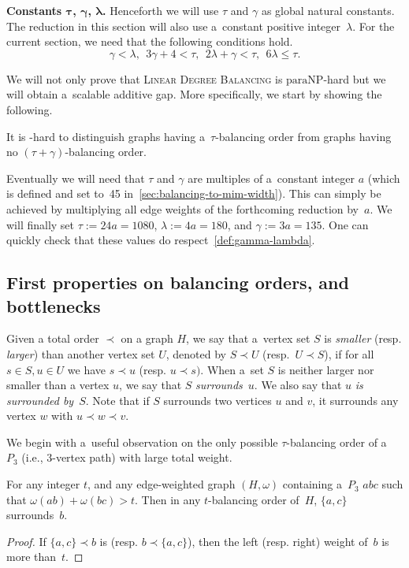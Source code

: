 \documentclass[a4paper,UKenglish,cleveref,hyperref,autoref]{lipics-v2021}
\newcommand{\paraNP}{\ensuremath{\mathrm{paraNP}}}
\newcommand{\weight}{\omega}
\newcommand{\ldb}{\textsc{Linear Degree Balancing}\xspace}
\begin{document}
\medskip

\textbf{Constants $\bm{\tau}$, $\bm{\gamma}$, $\bm{\lambda}$.}
Henceforth we will use $\tau$ and $\gamma$ as global natural constants.
The reduction in this section will also use a~constant positive integer~$\lambda$.
For the current section, we need that the following conditions hold.
\begin{equation}\label{def:gamma-lambda}
 \gamma < \lambda,~~3\gamma + 4 < \tau,~~2\lambda + \gamma < \tau,~~6 \lambda \leqslant \tau.
\end{equation}

We will not only prove that \ldb is \paraNP-hard but we will obtain a~scalable additive gap. 
More specifically, we start by showing the following.

\begin{theorem}\label{thm:ldb}
  It is \NP-hard to distinguish graphs having \mbox{a~$\tau$-balancing} order from graphs having no $(\tau + \gamma)$-balancing order.
\end{theorem}

Eventually we will need that $\tau$ and $\gamma$ are multiples of a~constant integer $a$ (which is defined and set to~45 in~\cref{sec:balancing-to-mim-width}).
This can simply be achieved by multiplying all edge weights of the forthcoming reduction by~$a$.
We will finally set $\tau := 24a = 1080$, $\lambda := 4a = 180$, and $\gamma := 3a = 135$.
One can quickly check that these values do respect~\cref{def:gamma-lambda}.

\subsection{First properties on balancing orders, and bottlenecks}

Given a total order $\prec$ on a graph $H$, we say that a~vertex set $S$ is \emph{smaller} (resp. \emph{larger}) than another vertex set $U$, denoted by $S \prec U$ (resp.~$U \prec S$), if for all $s \in S, u \in U$ we have $s \prec u$ (resp. $u \prec s)$.
When a~set $S$ is neither larger nor smaller than a vertex $u$, we say that $S$ \emph{surrounds}~$u$.
We also say that $u$ \emph{is surrounded by}~$S$.
Note that if $S$ surrounds two vertices $u$ and $v$, it surrounds any vertex $w$ with $u \prec w \prec v$.

We begin with a~useful observation on the only possible $\tau$-balancing order of a~$P_3$ (i.e., 3-vertex path) with large total weight.

\begin{lemma}\label{lem:P3-order}
For any integer $t$, and any edge-weighted graph $(H,\weight)$ containing a~$P_3$ $abc$ such that $\weight(ab) + \weight(bc) > t$.
Then in any $t$-balancing order of~$H$, $\{a, c\}$ surrounds~$b$.
\end{lemma}
\begin{proof}
If $\{a, c\} \prec b$ is (resp. $b \prec \{a, c\}$), then the left (resp. right) weight of~$b$ is more than~$t$.
\end{proof}
\end{document}
